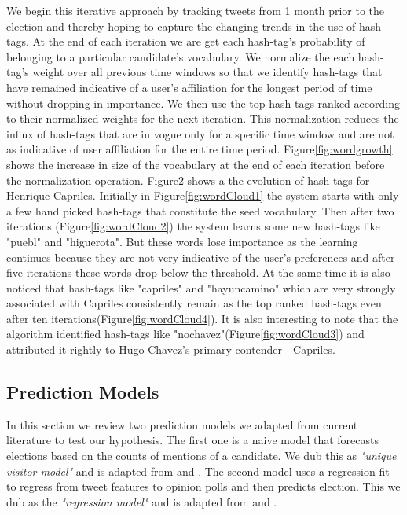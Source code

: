We begin this iterative approach by tracking tweets from 1 month prior to the election and thereby hoping to capture the changing trends in the use of hash-tags.
At the end of each iteration we are get each hash-tag's probability of belonging to a particular candidate's vocabulary. 
We normalize the each hash-tag's weight over all previous time windows so that we identify hash-tags that have remained indicative of a user's affiliation for the longest period of time without dropping in importance. 
We then use the top hash-tags ranked according to their normalized weights  for the next iteration.
This normalization reduces the influx of hash-tags that are in vogue only for a specific time window and are not as indicative of user affiliation for the entire time period. 
Figure\ref{fig:wordgrowth} shows the increase in size of the vocabulary at the end of each iteration before the normalization operation.
Figure2 shows a  the evolution  of hash-tags for Henrique Capriles.
Initially in Figure\ref{fig:wordCloud1} the system starts with only a few hand picked hash-tags that constitute the seed vocabulary. 
Then after two iterations (Figure\ref{fig:wordCloud2}) the system learns some new hash-tags like "puebl" and "higuerota". 
But these words lose importance as the learning continues because they are not very indicative of the user's preferences and  after five iterations these words drop below the threshold. 
At the same time it is also noticed that hash-tags like "capriles" and "hayuncamino" which are very strongly associated with Capriles consistently remain as the top ranked hash-tags even after ten iterations(Figure\ref{fig:wordCloud4}). 
It is also interesting to note that the algorithm identified hash-tags like "nochavez"(Figure\ref{fig:wordCloud3}) and attributed it rightly to Hugo Chavez's primary contender - Capriles. 
\subsection{Prediction Models}
In this section we review two prediction models we adapted from current literature to test our hypothesis. 
The first one is a naive model that forecasts elections based on the counts of mentions of a candidate.
We dub this as  \emph{"unique visitor model"} and is adapted from \cite{saez2011total} and \cite{tumasjan2010predicting}.
The second model uses a regression fit to regress from tweet features to opinion polls and then predicts election. 
This we dub as the \emph{"regression model"} and is adapted from \cite{bermingham2011using} and \cite{o2010tweets}.

